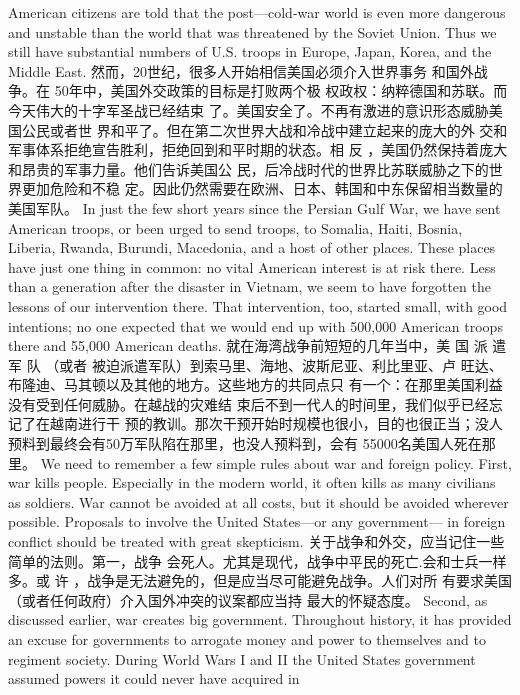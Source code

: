 \begin{paracol}{2}
American citizens are told that the post---cold-war world is
even more dangerous and unstable than the world that was
threatened by the Soviet Union. Thus we still have substantial
numbers of U.S. troops in Europe, Japan, Korea, and the Middle East.
\switchcolumn
然而，20世纪，很多人开始相信美国必须介入世界事务
和国外战争。在 50年中，美国外交政策的目标是打败两个极
权政权：纳粹德国和苏联。而今天伟大的十字军圣战已经结束
了。美国安全了。不再有激进的意识形态威胁美国公民或者世
界和平了。但在第二次世界大战和冷战中建立起来的庞大的外
交和军事体系拒绝宣告胜利，拒绝回到和平时期的状态。相
反 ，美国仍然保持着庞大和昂贵的军事力量。他们告诉美国公
民，后冷战时代的世界比苏联威胁之下的世界更加危险和不稳
定。因此仍然需要在欧洲、日本、韩国和中东保留相当数量的
美国军队。
\switchcolumn*
In just the few short years since the Persian Gulf War, we
have sent American troops, or been urged to send troops, to Somalia, Haiti, Bosnia, Liberia, Rwanda, Burundi, Macedonia,
and a host of other places. These places have just one thing in
common: no vital American interest is at risk there. Less than a
generation after the disaster in Vietnam, we seem to have forgotten the lessons of our intervention there. That intervention,
too, started small, with good intentions; no one expected that
we would end up with 500,000 American troops there and
55,000 American deaths.
\switchcolumn
就在海湾战争前短短的几年当中，美 国 派 遣 军 队 （或者
被迫派遣军队）到索马里、海地、波斯尼亚、利比里亚、卢
旺达、布隆迪、马其顿以及其他的地方。这些地方的共同点只
有一个：在那里美国利益没有受到任何威胁。在越战的灾难结
束后不到一代人的时间里，我们似乎已经忘记了在越南进行干
预的教训。那次干预开始时规模也很小，目的也很正当；没人
预料到最终会有50万军队陷在那里，也没人预料到，会有
55000名美国人死在那里。
\switchcolumn*
We need to remember a few simple rules about war and foreign policy. First, war kills people. Especially in the modern
world, it often kills as many civilians as soldiers. War cannot be
avoided at all costs, but it should be avoided wherever possible. Proposals to involve the United States---or any government---
in foreign conflict should be treated with great skepticism.
\switchcolumn
关于战争和外交，应当记住一些简单的法则。第一，战争
会死人。尤其是现代，战争中平民的死亡.会和士兵一样多。或
许 ，战争是无法避免的，但是应当尽可能避免战争。人们对所
有要求美国（或者任何政府）介入国外冲突的议案都应当持
最大的怀疑态度。
\switchcolumn*
Second, as discussed earlier, war creates big government.
Throughout history, it has provided an excuse for governments
to arrogate money and power to themselves and to regiment society. During World Wars I and II the United States government assumed powers it could never have acquired in

\end{paracol}
